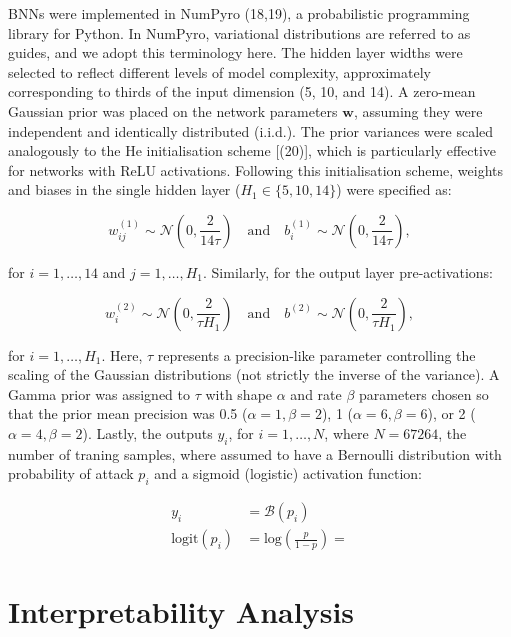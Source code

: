 \documentclass[
  a4paper,
]{scrreprt}
\begin{document}
BNNs were implemented in NumPyro (18,19), a probabilistic programming
library for Python. In NumPyro, variational distributions are referred
to as guides, and we adopt this terminology here. The hidden layer
widths were selected to reflect different levels of model complexity,
approximately corresponding to thirds of the input dimension (5, 10, and
14). A zero-mean Gaussian prior was placed on the network parameters
\(\mathbf{w}\), assuming they were independent and identically
distributed (i.i.d.). The prior variances were scaled analogously to the
He initialisation scheme {[}(20){]}, which is particularly effective for
networks with ReLU activations. Following this initialisation scheme,
weights and biases in the single hidden layer (\(H_1 \in \{5,10,14\}\))
were specified as:

\[
w_{ij}^{(1)} \sim \mathcal{N}\left(0, \frac{2}{14 \tau}\right) \quad \text{and} \quad b_{i}^{(1)} \sim \mathcal{N}\left(0, \frac{2}{14 \tau}\right),
\]

for \(i = 1, \ldots, 14\) and \(j = 1, \ldots, H_1\). Similarly, for the
output layer pre-activations:

\[
w_{i}^{(2)} \sim \mathcal{N}\left(0, \frac{2}{\tau H_1}\right) \quad \text{and} \quad b^{(2)} \sim \mathcal{N}\left(0, \frac{2}{\tau H_1}\right),
\]

for \(i = 1, \ldots, H_1\). Here, \(\tau\) represents a precision-like
parameter controlling the scaling of the Gaussian distributions (not
strictly the inverse of the variance). A Gamma prior was assigned to
\(\tau\) with shape \(\alpha\) and rate \(\beta\) parameters chosen so
that the prior mean precision was 0.5 (\(\alpha=1, \beta=2\)), 1
(\(\alpha=6, \beta=6\)), or 2 (\(\alpha=4, \beta=2\)). Lastly, the
outputs \(y_i\), for \(i=1,\ldots,N\), where \(N=67264\), the number of
traning samples, where assumed to have a Bernoulli distribution with
probability of attack \(p_i\) and a sigmoid (logistic) activation
function:

\[
\begin{aligned}
y_i &= \mathcal{B}(p_i) \\
\text{logit}(p_i) &= \text{log}\left(\frac{p}{1-p}\right) = 
\end{aligned}
\]

\section{Interpretability Analysis}\label{interpretability-analysis}

\end{document}
